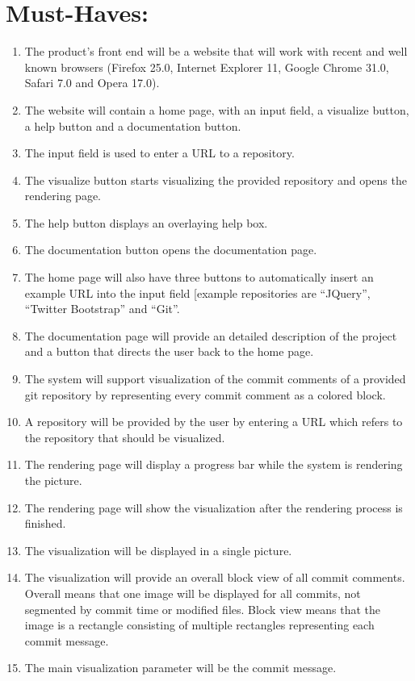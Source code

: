 \documentclass[12pt]{scrartcl}
\begin{document}
\section{Must-Haves:}
\begin{enumerate}
\item The product's front end will be a website that will work with recent and well known browsers (Firefox 25.0, Internet Explorer 11, Google Chrome 31.0, Safari 7.0 and Opera 17.0). 
\item The website will contain a home page, with an input field, a visualize button, a help button and a documentation button.
\item The input field is used to enter a URL to a repository.
\item The visualize button starts visualizing the provided repository and opens the rendering page.
\item The help button displays an overlaying help box.
\item The documentation button opens the documentation page.
\item The home page will also have three buttons to automatically insert an example URL into the input field [example repositories are \enquote{JQuery}, \enquote{Twitter Bootstrap} and \enquote{Git}.
\item The documentation page will provide an detailed description of the project and a button that directs the user back to the home page.
\item The system will support visualization of the commit comments of a provided git repository by representing every commit comment as a colored block.
\item A repository will be provided by the user by entering a URL which refers to the repository that should be visualized.
\item The rendering page will display a progress bar while the system is rendering the picture.
\item The rendering page will show the visualization after the rendering process is finished.
\item The visualization will be displayed in a single picture.
\item The visualization will provide an overall block view of all commit
	comments. Overall means that one image will be displayed for all
	commits, not segmented by commit time or modified files. Block view means
	that the image is a rectangle consisting of multiple rectangles
	representing each commit message.
\item The main visualization parameter will be the commit message.

\end{enumerate}
\end{document}
